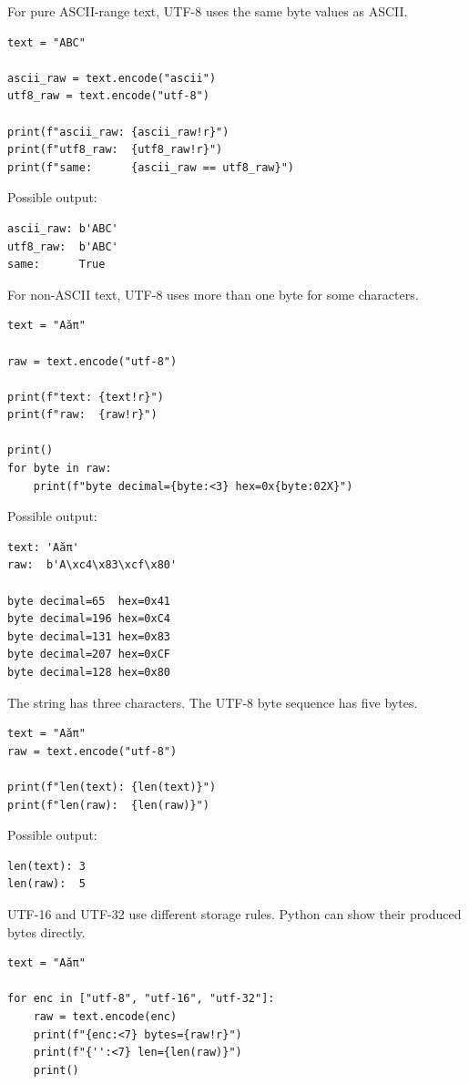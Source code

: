 For pure ASCII-range text, UTF-8 uses the same byte values as ASCII.

\begin{verbatim}
text = "ABC"

ascii_raw = text.encode("ascii")
utf8_raw = text.encode("utf-8")

print(f"ascii_raw: {ascii_raw!r}")
print(f"utf8_raw:  {utf8_raw!r}")
print(f"same:      {ascii_raw == utf8_raw}")
\end{verbatim}

Possible output:

\begin{verbatim}
ascii_raw: b'ABC'
utf8_raw:  b'ABC'
same:      True
\end{verbatim}

For non-ASCII text, UTF-8 uses more than one byte for some characters.

\begin{verbatim}
text = "Aăπ"

raw = text.encode("utf-8")

print(f"text: {text!r}")
print(f"raw:  {raw!r}")

print()
for byte in raw:
    print(f"byte decimal={byte:<3} hex=0x{byte:02X}")
\end{verbatim}

Possible output:

\begin{verbatim}
text: 'Aăπ'
raw:  b'A\xc4\x83\xcf\x80'

byte decimal=65  hex=0x41
byte decimal=196 hex=0xC4
byte decimal=131 hex=0x83
byte decimal=207 hex=0xCF
byte decimal=128 hex=0x80
\end{verbatim}

The string has three characters. The UTF-8 byte sequence has five bytes.

\begin{verbatim}
text = "Aăπ"
raw = text.encode("utf-8")

print(f"len(text): {len(text)}")
print(f"len(raw):  {len(raw)}")
\end{verbatim}

Possible output:

\begin{verbatim}
len(text): 3
len(raw):  5
\end{verbatim}

UTF-16 and UTF-32 use different storage rules. Python can show their produced bytes directly.

\begin{verbatim}
text = "Aăπ"

for enc in ["utf-8", "utf-16", "utf-32"]:
    raw = text.encode(enc)
    print(f"{enc:<7} bytes={raw!r}")
    print(f"{'':<7} len={len(raw)}")
    print()
\end{verbatim}

